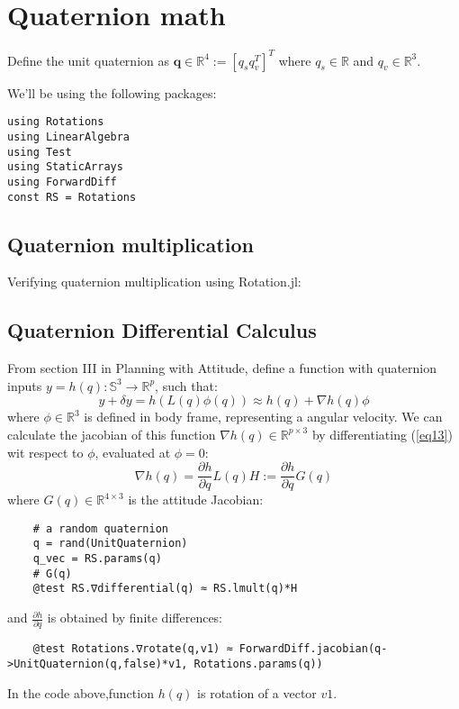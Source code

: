 \section{Quaternion math}
Define the unit quaternion as $\textbf{q} \in \mathbb{R}^4 := [q_s q_v^T]^T$ where $q_s \in \mathbb{R}$ and $q_v \in \mathbb{R}^3$.

We'll be using the following packages:
\begin{lstlisting}
using Rotations
using LinearAlgebra
using Test
using StaticArrays
using ForwardDiff
const RS = Rotations
\end{lstlisting}

\subsection{Quaternion multiplication}
Verifying quaternion multiplication using Rotation.jl:


\subsection{Quaternion Differential Calculus}
From section III in Planning with Attitude\cite{jackson2021planning},
define a function with quaternion inputs $y=h(q): \mathbb{S}^3 \rightarrow \mathbb{R}^p$, such that:
\begin{equation}
    y+\delta y = h(L(q)\phi(q)) \approx h(q) + \nabla h(q)\phi
    \label{eq13}
\end{equation}
where $\phi \in \mathbb{R}^3$ is defined in body frame, representing a angular velocity.
We can calculate the jacobian of this function $\nabla h(q) \in \mathbb{R}^{p \times 3}$ by differentiating (\ref{eq13}) wit respect to $\phi$, evaluated at $\phi = 0$:
\begin{equation}
    \nabla h(q) = \frac{\partial h}{\partial q}L(q)H := \frac{\partial h}{\partial q}G(q)
\end{equation}
where $G(q) \in \mathbb{R}^{4 \times 3}$ is the attitude Jacobian:
\begin{lstlisting}
    # a random quaternion
    q = rand(UnitQuaternion)
    q_vec = RS.params(q)
    # G(q)
    @test RS.∇differential(q) ≈ RS.lmult(q)*H
\end{lstlisting}
and $\frac{\partial h}{\partial q}$ is obtained by finite differences:
\begin{lstlisting}
    @test Rotations.∇rotate(q,v1) ≈ ForwardDiff.jacobian(q->UnitQuaternion(q,false)*v1, Rotations.params(q))
\end{lstlisting}
In the code above,function $h(q)$ is rotation of a vector $v1$.

\pagebreak